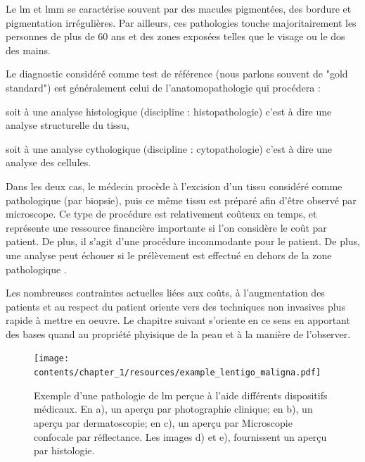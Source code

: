 Le \gls{lm} et \gls{lmm} se caractérise souvent par des macules pigmentées, des bordure et pigmentation irrégulières. Par ailleurs, ces pathologies touche majoritairement les personnes de plus de 60 ans et des zones exposées telles que le visage ou le dos des mains.\par
Le diagnostic considéré comme test de référence (nous parlons souvent de "gold standard") est généralement celui de l'anatomopathologie qui procédera :
\begin{inlinerate}
\item soit à une analyse histologique (discipline : histopathologie) c'est à dire une analyse structurelle du tissu,
\item soit à une analyse cythologique (discipline : cytopathologie) c'est à dire une analyse des cellules.
\end{inlinerate}
Dans les deux cas, le médecin procède à l'excision d'un tissu considéré comme pathologique (par biopsie), puis ce même tissu est préparé afin d'être observé par microscope. Ce type de procédure est relativement coûteux en temps, et représente une ressource financière importante si l'on considère le coût par patient. De plus, il s'agit d'une procédure incommodante pour le patient. De plus, une analyse peut échouer si le prélèvement est effectué en dehors de la zone pathologique \cite{LeGal2011}.\par
Les nombreuses contraintes actuelles liées aux coûts, à l'augmentation des patients et au respect du patient oriente vers des techniques non invasives plus rapide à mettre en oeuvre. Le chapitre suivant s'oriente en ce sens en apportant des bases quand au propriété phyisique de la peau et à la manière de l'observer.\par

\begin{figure}[H]
    \centering
    \texttt{[image: contents/chapter\_1/resources/example\_lentigo\_maligna.pdf]}
    \caption{Exemple d'une pathologie de \gls{lm} perçue à l'aide différents dispositifs médicaux. En a), un aperçu par photographie clinique; en b), un aperçu par dermatoscopie; en c), un aperçu par Microscopie confocale par réflectance. Les images d) et e), fournissent un aperçu par histologie.}
    \label{fig:example_lentigo_maligna}
\end{figure}\par
